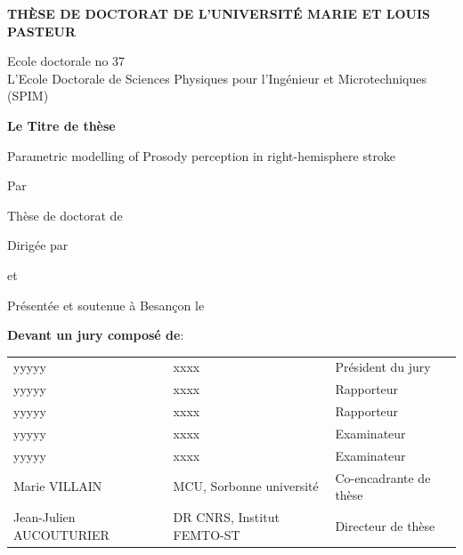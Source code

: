 \begin{center}
\huge
{\bfseries THÈSE DE DOCTORAT DE L’UNIVERSIT\'E MARIE ET LOUIS PASTEUR}

\large Ecole doctorale no 37 \\
L’Ecole Doctorale de Sciences Physiques pour l’Ingénieur et Microtechniques (SPIM)

\vspace{0.5cm}

\Huge
{\bfseries Le Titre de thèse}


\vspace{0.3cm}
\large 
Parametric modelling of Prosody perception in right-hemisphere stroke


\vspace{0.5cm}
\Large Par 
\vspace{1.5cm}

Thèse de doctorat de 

Dirigée par  

et 


Présentée et soutenue à Besançon le \\[5mm]

\vspace{0.5cm}

\textbf{Devant un jury composé de}:
\end{center}
\begin{tabular}{l l l}
yyyyy        & xxxx           & Président du jury \\
yyyyy  & xxxx         & Rapporteur \\
yyyyy & xxxx             & Rapporteur \\
yyyyy    & xxxx            & Examinateur \\
yyyyy    & xxxx            & Examinateur \\
Marie VILLAIN & MCU, Sorbonne université                              & Co-encadrante de thèse \\
Jean-Julien AUCOUTURIER         & DR CNRS, Institut FEMTO-ST             & Directeur de thèse \\
\end{tabular}

\restoregeometry
\cleardoublepage